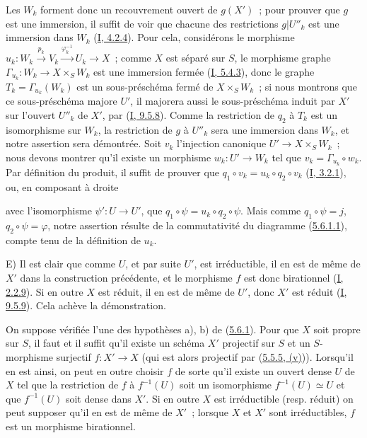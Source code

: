 Les $W_k$ forment donc un recouvrement ouvert de $g(X')$~; pour prouver que
$g$ est une immersion, il suffit de voir que chacune des restrictions
$g|U''_k$ est une immersion dans $W_k$
(\hyperref[I.4.2.4-fr]{I, 4.2.4}). Pour cela, considérons le morphisme
$u_k:W_k\xrightarrow{p_k}V_k\xrightarrow{\varphi_k^{-1}}U_k\to X$~; comme
$X$ est séparé sur $S$, le morphisme graphe
$\Gamma_{u_k}:W_k\to X\times_SW_k$ est une immersion fermée
(\hyperref[I.5.4.3-fr]{I, 5.4.3}), donc le graphe
$T_k=\Gamma_{u_k}(W_k)$ est un sous-préschéma fermé de $X\times_SW_k$~; si
nous montrons que ce sous-préschéma majore $U'$, il majorera aussi le
sous-préschéma induit par $X'$ sur l'ouvert $U''_k$ de $X'$, par
(\hyperref[I.9.5.8-fr]{I, 9.5.8}). Comme la restriction de $q_2$ à $T_k$ est
un isomorphisme sur $W_k$, la restriction de $g$ à $U''_k$ sera une immersion
dans $W_k$, et notre assertion sera démontrée. Soit $v_k$ l'injection
canonique $U'\to X\times_SW_k$~; nous devons montrer qu'il existe un morphisme
$w_k:U'\to W_k$ tel que $v_k=\Gamma_{u_k}\circ w_k$. Par définition du
produit, il suffit de prouver que
$q_1\circ v_k=u_k\circ q_2\circ v_k$
(\hyperref[I.3.2.1-fr]{I, 3.2.1}), ou, en composant à droite


avec l'isomorphisme $\psi':U\to U'$, que
$q_1\circ\psi=u_k\circ q_2\circ\psi$. Mais comme $q_1\circ\psi=j$,
$q_2\circ\psi=\varphi$, notre assertion résulte de la commutativité du
diagramme (\hyperref[II.5.6.1.1-fr]{5.6.1.1}), compte tenu de la définition de
$u_k$.

E) Il est clair que comme $U$, et par suite $U'$, est irréductible, il en est
de même de $X'$ dans la construction précédente, et le morphisme $f$ est donc
birationnel (\hyperref[I.2.2.9-fr]{I, 2.2.9}). Si en outre $X$ est réduit, il
en est de même de $U'$, donc $X'$ est réduit
(\hyperref[I.9.5.9-fr]{I, 9.5.9}). Cela achève la démonstration.

\begin{corollary}[5.6.2]
\label{II.5.6.2-fr}
On suppose vérifiée l'une des hypothèses a), b) de
(\hyperref[II.5.6.1-fr]{5.6.1}). Pour que $X$ soit propre sur $S$, il faut et
il suffit qu'il existe un schéma $X'$ projectif sur $S$ et un $S$-morphisme
surjectif $f:X'\to X$ (qui est alors projectif par
(\hyperref[II.5.5.5-fr]{5.5.5, (v)})). Lorsqu'il en est ainsi, on peut en
outre choisir $f$ de sorte qu'il existe un ouvert dense $U$ de $X$ tel que la
restriction de $f$ à $f^{-1}(U)$ soit un isomorphisme
$f^{-1}(U)\simeq U$ et que $f^{-1}(U)$ soit dense dans $X'$. Si en outre $X$
est irréductible (resp. réduit) on peut supposer qu'il en est de même de
$X'$~; lorsque $X$ et $X'$ sont irréductibles, $f$ est un morphisme
birationnel.
\end{corollary}

